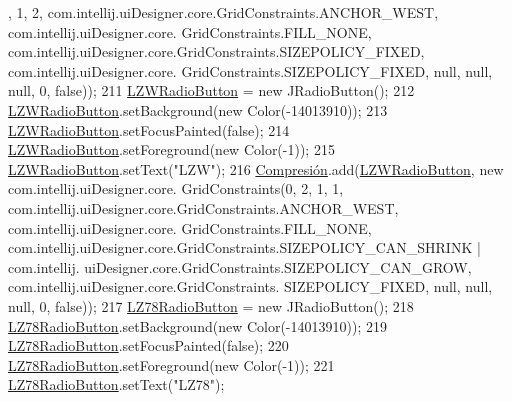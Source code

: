 \begin{DoxyCode}
      , 1, 2, com.intellij.uiDesigner.core.GridConstraints.ANCHOR\_WEST, com.intellij.uiDesigner.core.
      GridConstraints.FILL\_NONE, com.intellij.uiDesigner.core.GridConstraints.SIZEPOLICY\_FIXED, com.intellij.uiDesigner.core.
      GridConstraints.SIZEPOLICY\_FIXED, null, null, null, 0, \textcolor{keyword}{false}));
211         \hyperlink{classpresentacion_1_1form_1_1PopUp__Comp_a810fe251f9c88e3b83ce466feafafe2e}{LZWRadioButton} = \textcolor{keyword}{new} JRadioButton();
212         \hyperlink{classpresentacion_1_1form_1_1PopUp__Comp_a810fe251f9c88e3b83ce466feafafe2e}{LZWRadioButton}.setBackground(\textcolor{keyword}{new} Color(-14013910));
213         \hyperlink{classpresentacion_1_1form_1_1PopUp__Comp_a810fe251f9c88e3b83ce466feafafe2e}{LZWRadioButton}.setFocusPainted(\textcolor{keyword}{false});
214         \hyperlink{classpresentacion_1_1form_1_1PopUp__Comp_a810fe251f9c88e3b83ce466feafafe2e}{LZWRadioButton}.setForeground(\textcolor{keyword}{new} Color(-1));
215         \hyperlink{classpresentacion_1_1form_1_1PopUp__Comp_a810fe251f9c88e3b83ce466feafafe2e}{LZWRadioButton}.setText(\textcolor{stringliteral}{"LZW"});
216         \hyperlink{classpresentacion_1_1form_1_1PopUp__Comp_a5769b499f21466bae765c41428512966}{Compresión}.add(\hyperlink{classpresentacion_1_1form_1_1PopUp__Comp_a810fe251f9c88e3b83ce466feafafe2e}{LZWRadioButton}, \textcolor{keyword}{new} com.intellij.uiDesigner.core.
      GridConstraints(0, 2, 1, 1, com.intellij.uiDesigner.core.GridConstraints.ANCHOR\_WEST, com.intellij.uiDesigner.core.
      GridConstraints.FILL\_NONE, com.intellij.uiDesigner.core.GridConstraints.SIZEPOLICY\_CAN\_SHRINK | com.intellij.
      uiDesigner.core.GridConstraints.SIZEPOLICY\_CAN\_GROW, com.intellij.uiDesigner.core.GridConstraints.
      SIZEPOLICY\_FIXED, null, null, null, 0, \textcolor{keyword}{false}));
217         \hyperlink{classpresentacion_1_1form_1_1PopUp__Comp_ac750ecbde516e2fee470693124d2ff63}{LZ78RadioButton} = \textcolor{keyword}{new} JRadioButton();
218         \hyperlink{classpresentacion_1_1form_1_1PopUp__Comp_ac750ecbde516e2fee470693124d2ff63}{LZ78RadioButton}.setBackground(\textcolor{keyword}{new} Color(-14013910));
219         \hyperlink{classpresentacion_1_1form_1_1PopUp__Comp_ac750ecbde516e2fee470693124d2ff63}{LZ78RadioButton}.setFocusPainted(\textcolor{keyword}{false});
220         \hyperlink{classpresentacion_1_1form_1_1PopUp__Comp_ac750ecbde516e2fee470693124d2ff63}{LZ78RadioButton}.setForeground(\textcolor{keyword}{new} Color(-1));
221         \hyperlink{classpresentacion_1_1form_1_1PopUp__Comp_ac750ecbde516e2fee470693124d2ff63}{LZ78RadioButton}.setText(\textcolor{stringliteral}{"LZ78"});

\end{DoxyCode}
